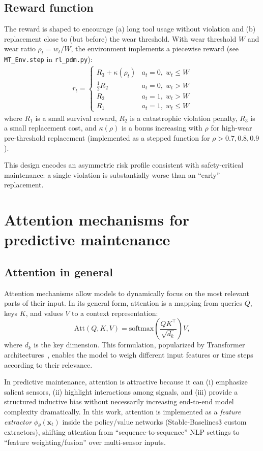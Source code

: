 \documentclass[11pt]{article}
\begin{document}
\subsection{Reward function}
The reward is shaped to encourage (a) long tool usage without violation and (b) replacement close to (but before) the wear threshold. With wear threshold $W$ and wear ratio $\rho_t=w_t/W$, the environment implements a piecewise reward (see \texttt{MT\_Env.step} in \texttt{rl\_pdm.py}):
\begin{align}
  r_t =
  \begin{cases}
    R_3 + \kappa(\rho_t) & a_t=0,\; w_t\le W \\
    \tfrac{1}{2}R_2 & a_t=0,\; w_t>W \\
    R_2 & a_t=1,\; w_t>W \\
    R_1 & a_t=1,\; w_t\le W
  \end{cases}
\end{align}
where $R_1$ is a small survival reward, $R_2$ is a catastrophic violation penalty, $R_3$ is a small replacement cost, and $\kappa(\rho)$ is a bonus increasing with $\rho$ for high-wear pre-threshold replacement (implemented as a stepped function for $\rho>0.7,0.8,0.9$).

This design encodes an asymmetric risk profile consistent with safety-critical maintenance: a single violation is substantially worse than an ``early'' replacement.

\section{Attention mechanisms for predictive maintenance}
\subsection{Attention in general}
Attention mechanisms allow models to dynamically focus on the most relevant parts of their input. In its general form, attention is a mapping from queries $Q$, keys $K$, and values $V$ to a context representation:
\begin{equation}
  \mathrm{Att}(Q,K,V) = \mathrm{softmax}\!\left(\frac{QK^\top}{\sqrt{d_k}}\right)V,
\end{equation}
where $d_k$ is the key dimension. This formulation, popularized by Transformer architectures~\cite{Vaswani2017Attention}, enables the model to weigh different input features or time steps according to their relevance.

In predictive maintenance, attention is attractive because it can (i) emphasize salient sensors, (ii) highlight interactions among signals, and (iii) provide a structured inductive bias without necessarily increasing end-to-end model complexity dramatically. In this work, attention is implemented as a \emph{feature extractor} $\phi_\theta(\mathbf{x}_t)$ inside the policy/value networks (Stable-Baselines3 custom extractors), shifting attention from ``sequence-to-sequence'' NLP settings to ``feature weighting/fusion'' over multi-sensor inputs.
\end{document}
